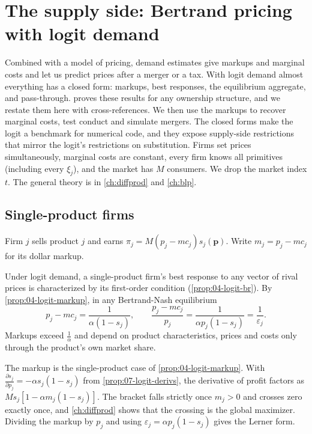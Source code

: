 \section{The supply side: Bertrand pricing with logit demand}\label{sec:07-supply}

Combined with a model of pricing, demand estimates give markups and marginal costs and let us predict prices after
a merger or a tax. With logit demand almost everything has a closed form: markups, best responses, the equilibrium
aggregate, and pass-through.  proves these results for any ownership structure, and we restate them
here with cross-references. We then use the markups to recover marginal costs, test conduct and simulate mergers. The
closed forms make the logit a benchmark for numerical code, and they expose supply-side restrictions that mirror the
logit's restrictions on substitution. Firms set prices simultaneously, marginal costs are constant, every firm knows
all primitives (including every $\xi_j$), and the market has $M$ consumers. We drop the market index $t$. The general
theory is in \cref{ch:diffprod} and \cref{ch:blp}.

\subsection{Single-product firms}\label{sec:07-bertrand-single}

Firm $j$ sells product $j$ and earns $\pi_j = M(p_j - mc_j)s_j(\boldsymbol p)$. Write $m_j = p_j - mc_j$ for its dollar
markup.

\begin{proposition}\label{prop:07-logit-markup}
Under logit demand, a single-product firm's best response to any vector of rival prices is characterized by its
first-order condition (\cref{prop:04-logit-br}). By \cref{prop:04-logit-markup}, in any Bertrand-Nash equilibrium
\begin{equation}\label{eq:07-logit-markup}
  p_j - mc_j = \frac{1}{\alpha(1 - s_j)}, \qquad \frac{p_j - mc_j}{p_j} = \frac{1}{\alpha p_j(1 - s_j)} =
  \frac{1}{\varepsilon_j}.
\end{equation}
Markups exceed $\frac{1}{\alpha}$ and depend on product characteristics, prices and costs only through the product's
own market share.
\end{proposition}

The markup is the single-product case of \cref{prop:04-logit-markup}. With $\frac{\partial s_j}{\partial p_j} =
-\alpha s_j(1 - s_j)$ from \cref{prop:07-logit-derivs}, the derivative of profit factors as $M s_j[1 - \alpha m_j(1 -
s_j)]$. The bracket falls strictly once $m_j > 0$ and crosses zero exactly once, and \cref{ch:diffprod} shows that the
crossing is the global maximizer. Dividing the markup by $p_j$ and using $\varepsilon_j = \alpha p_j(1 - s_j)$ gives
the Lerner form.

